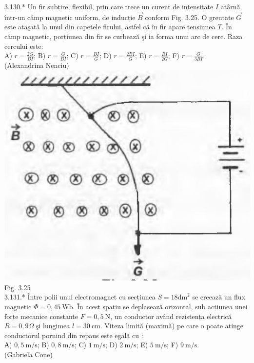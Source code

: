 \documentclass[10pt]{article}
\begin{document}
3.130.* Un fir subțire, flexibil, prin care trece un curent de intensitate $I$ atârnă într-un câmp magnetic uniform, de inducție $\vec{B}$ conform Fig. 3.25. O greutate $\vec{G}$ este ataşată la unul din capetele firului, astfel că în fir apare tensiunea $T$. În câmp magnetic, porțiunea din fir se curbează şi ia forma unui arc de cerc. Raza cercului este:\\ A) $r=\frac{2 G}{B I}$; B) $r=\frac{G}{B I}$; C) $r=\frac{B I}{G}$; D) $r=\frac{2 B I}{G}$; E) $r=\frac{B I}{2 G}$; F) $r=\frac{G}{3 B I}$.\\ (Alexandrina Nenciu)\\ \includegraphics[max width=\textwidth, center]{2025_07_01_5b3ff9fa0d508c8e9f17g-172} Fig. 3.25\\

3.131.* Între polii unui electromagnet cu secțiunea $S=18 \mathrm{dm}^{2}$ se creează un flux magnetic $\Phi=0,45 \mathrm{~Wb}$. În acest spațiu se deplasează orizontal, sub acțiunea unei forțe mecanice constante $F=0,5 \mathrm{~N}$, un conductor având rezistența electrică $R=0,9 \Omega$ şi lungimea $l=30 \mathrm{~cm}$. Viteza limită (maximă) pe care o poate atinge conductorul pornind din repaus este egală cu :\\ А) $0,5 \mathrm{~m} / \mathrm{s}$; B) $0,8 \mathrm{~m} / \mathrm{s}$; C) $1 \mathrm{~m} / \mathrm{s}$; D) $2 \mathrm{~m} / \mathrm{s}$; E) $5 \mathrm{~m} / \mathrm{s}$; F) $9 \mathrm{~m} / \mathrm{s}$.\\ (Gabriela Cone)\\
\end{document}
